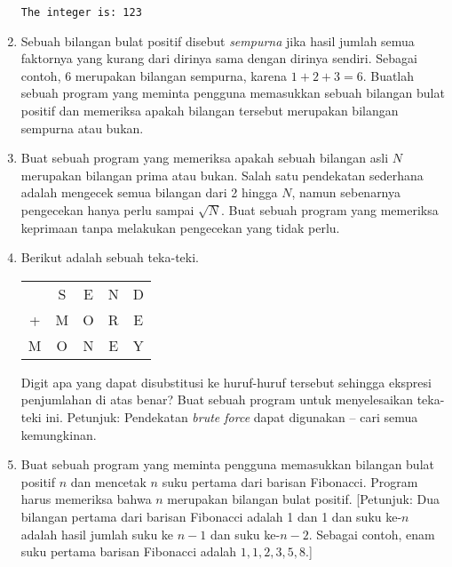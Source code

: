 \documentclass[14pt]{extarticle}
\begin{document}
\begin{enumerate}
	\texttt{The integer is: 123}
	\item Sebuah bilangan bulat positif disebut \emph{sempurna} jika hasil jumlah semua faktornya yang kurang dari dirinya sama dengan dirinya sendiri. Sebagai contoh, $6$ merupakan bilangan sempurna, karena $1+2+3=6$.
	Buatlah sebuah program yang meminta pengguna memasukkan sebuah bilangan bulat positif dan memeriksa apakah bilangan tersebut merupakan bilangan sempurna atau bukan.
	\item Buat sebuah program yang memeriksa apakah sebuah bilangan asli $N$ merupakan bilangan prima atau bukan. Salah satu pendekatan sederhana adalah mengecek semua bilangan dari 2 hingga $N$, namun sebenarnya pengecekan hanya perlu sampai $\sqrt{N}$. Buat sebuah program yang memeriksa keprimaan tanpa melakukan pengecekan yang tidak perlu.  
	\item Berikut adalah sebuah teka-teki.
	\begin{center}
		\begin{tabular}{ccccc}
			&S&E&N&D \\
		+	&M&O&R&E \\ \hline
		M	&O&N&E&Y
		\end{tabular}
	\end{center}
	Digit apa yang dapat disubstitusi ke huruf-huruf tersebut  sehingga ekspresi penjumlahan di atas benar? Buat sebuah program untuk menyelesaikan teka-teki ini. Petunjuk: Pendekatan \emph{brute force} dapat digunakan -- cari semua kemungkinan.
	\item Buat sebuah program yang meminta pengguna memasukkan bilangan bulat positif $n$ dan mencetak $n$ suku pertama dari barisan  Fibonacci. Program harus memeriksa bahwa $n$ merupakan bilangan bulat positif. [Petunjuk: Dua bilangan pertama dari barisan Fibonacci adalah 1 dan 1 dan suku ke-$n$ adalah hasil jumlah suku ke $n-1$ dan suku ke-$n-2$. Sebagai contoh, enam suku pertama barisan Fibonacci adalah $1,1,2,3,5,8$.]

\end{enumerate}
\end{document}
